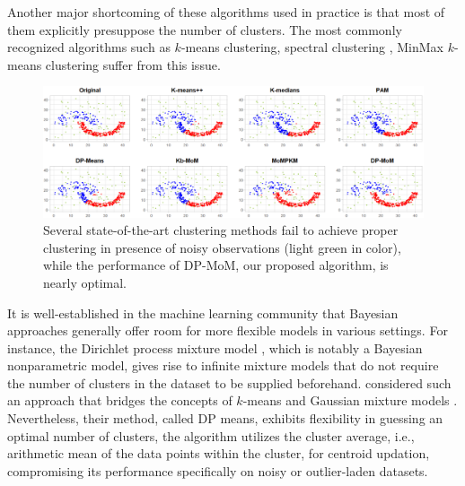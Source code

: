 \documentclass[12pt]{article}
\begin{document}

Another major shortcoming of these algorithms used in practice is that most of them explicitly presuppose the number of clusters. The most commonly recognized algorithms such as $k$-means clustering, spectral clustering \cite{spectral-andrew-ng}, MinMax $k$-means clustering \cite{minmax-km} suffer from this issue. 

\begin{figure}[t]
    \centering
    \includegraphics[width = \textwidth]{Diagrams/plot-jain-sim-comparison-0.7.png}
    \caption{Several state-of-the-art clustering methods fail to achieve proper clustering in presence of noisy observations (light green in color), while the performance of DP-MoM, our proposed algorithm, is nearly optimal.}
    \label{fig:jain-out}
\end{figure}

It is well-established in the machine learning community that Bayesian approaches generally offer room for more flexible models in various settings. For instance, the Dirichlet process mixture model \cite{hjort_holmes_müller_walker_2010}, which is notably a Bayesian nonparametric model, gives rise to infinite mixture models that do not require the number of clusters in the dataset to be supplied beforehand. \cite{DP-Means} considered such an approach that bridges the concepts of $k$-means and Gaussian mixture models \cite{bishop2006pattern,murphy2018machine}. Nevertheless, their method, called DP means, exhibits flexibility in guessing an optimal number of clusters, the algorithm utilizes the cluster average, i.e., arithmetic mean of the data points within the cluster, for centroid updation, compromising its performance specifically on noisy or outlier-laden datasets.

\end{document}

